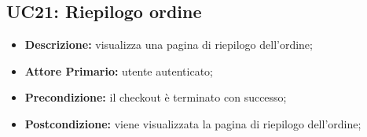 \subsection{UC21: Riepilogo ordine}
\label{sec:UC21}
\begin{itemize}
    \item \textbf{Descrizione:} visualizza una pagina di riepilogo dell'ordine;
    \item \textbf{Attore Primario:} utente autenticato;
    \item \textbf{Precondizione:} il checkout è terminato con successo;
    \item \textbf{Postcondizione:} viene visualizzata la pagina di riepilogo dell'ordine;
\end{itemize}
